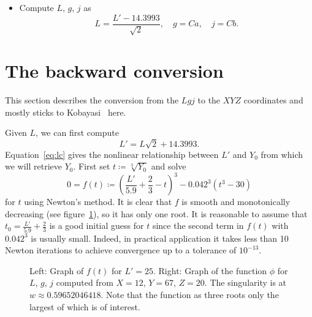 \documentclass{scrartcl}
\theoremstyle{named}
\begin{document}
\begin{itemize}
  \item Compute $L$, $g$, $j$ as
    \[
      L = \frac{L' - 14.3993}{\sqrt{2}},\quad g = Ca,\quad j = Cb.
    \]
\end{itemize}

\section{The backward conversion}

This section describes the conversion from the  $Lgj$ to the $XYZ$ coordinates and
mostly sticks to Kobayasi~\cite{kobayasi} here.

Given $L$, we can first compute
\[
  L' = L \sqrt{2} + 14.3993.
\]
Equation~\eqref{eq:lc} gives the nonlinear relationship between $L'$ and $Y_0$ from
which we will retrieve $Y_0$. First set $t\coloneqq \sqrt[3]{Y_0}$ and solve
\[
  0 = f(t) \coloneqq {\left(\frac{L'}{5.9} + \frac{2}{3} - t\right)}^3 - 0.042^3 (t^3 - 30)
\]
for $t$ using Newton's method. It is clear that $f$ is smooth and monotonically
decreasing (see figure~\ref{fig:singularity}), so it has only one root.
It is reasonable to assume that $t_0 = \frac{L'}{5.9} + \frac{2}{3}$
is a good initial guess for $t$ since the second term in $f(t)$ with $0.042^3$ is
usually small.
Indeed, in practical application it takes less than 10 Newton iterations to achieve
convergence up to a tolerance of $10^{-13}$.

\begin{figure}
  \centering
  \hfill
  
  \hfill
  
  \hfill
  \caption{Left: Graph of $f(t)$ for $L'=25$. Right: Graph of the function $\phi$ for $L$, $g$, $j$
  computed from $X=12$, $Y=67$, $Z=20$. The singularity is at $w\approx 0.59652046418$.
  Note that the function as three roots only the largest of which is of
  interest.}\label{fig:singularity}
\end{figure}
\end{document}
